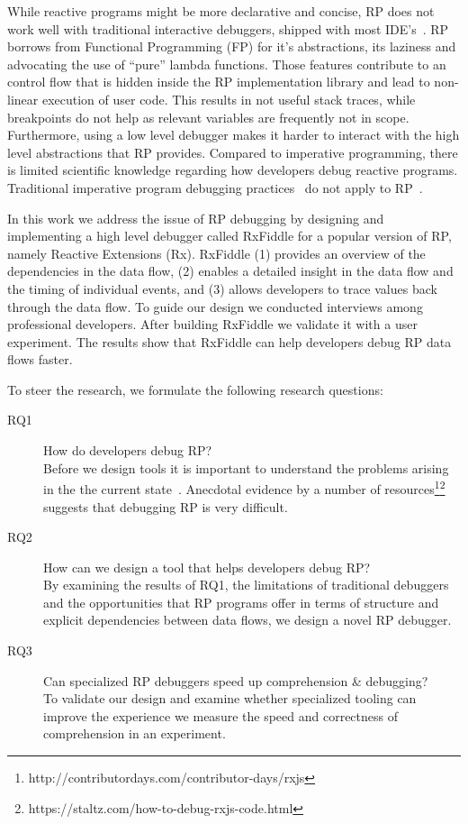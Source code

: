 While reactive programs might be more declarative and concise, RP does not work well with traditional interactive debuggers, shipped with most IDE's~\cite{salvaneschi2016debugging}. RP borrows from Functional Programming (FP) for it's abstractions, its laziness and advocating the use of ``pure'' lambda functions. Those features contribute to an control flow that is hidden inside the RP implementation library and lead to non-linear execution of user code. This results in not useful stack traces, while breakpoints do not help as relevant variables are frequently not in scope. Furthermore, using a low level debugger makes it harder to interact with the high level abstractions that RP provides.
Compared to imperative programming, there is limited scientific knowledge regarding how developers debug reactive programs. Traditional imperative program debugging practices~\cite{beller2017behavior} do not apply to RP~\cite{salvaneschi2016debugging}.

In this work we address the issue of RP debugging by designing and implementing a high level debugger called RxFiddle for a popular version of RP, namely Reactive Extensions (Rx). RxFiddle  (1) provides an overview of the dependencies in the data flow, (2) enables a detailed insight in the data flow and the timing of individual events, and (3) allows developers to trace values back through the data flow. To guide our design we conducted interviews among professional developers. After building RxFiddle we validate it with a user experiment. The results show that RxFiddle can help developers debug RP data flows faster.

To steer the research, we formulate the following research questions:

\begin{description}
\item[RQ1] How do developers debug RP? \\
Before we design tools it is important to understand the problems arising in the the current state~\cite{singer2010examination}. Anecdotal evidence by a number of resources\footnote{\label{foot:contribdays}http://contributordays.com/contributor-days/rxjs}\footnote{https://staltz.com/how-to-debug-rxjs-code.html}
suggests that debugging RP is very difficult.

\item[RQ2] How can we design a tool that helps developers debug RP? \\
By examining the results of RQ1, the limitations of traditional debuggers and the opportunities that RP programs offer in terms of structure and explicit dependencies between data flows, we design a novel RP debugger.

\item[RQ3] Can specialized RP debuggers speed up comprehension \& debugging? \\
To validate our design and examine whether specialized tooling can improve the experience we measure the speed and correctness of comprehension in an experiment.

\end{description}

